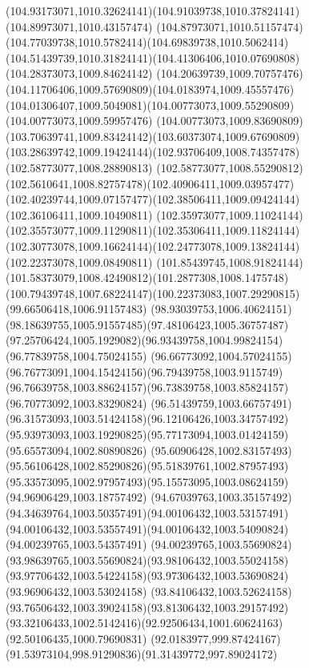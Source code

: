 {{		\curveto(104.93173071,1010.32624141)(104.91039738,1010.37824141)(104.89973071,1010.43157474)
		\curveto(104.87973071,1010.51157474)(104.77039738,1010.5782414)(104.69839738,1010.5062414)
		\curveto(104.51439739,1010.31824141)(104.41306406,1010.07690808)(104.28373073,1009.84624142)
		\curveto(104.20639739,1009.70757476)(104.11706406,1009.57690809)(104.0183974,1009.45557476)
		\curveto(104.01306407,1009.5049081)(104.00773073,1009.55290809)(104.00773073,1009.59957476)
		\curveto(104.00773073,1009.83690809)(103.70639741,1009.83424142)(103.60373074,1009.67690809)
		\curveto(103.28639742,1009.19424144)(102.93706409,1008.74357478)(102.58773077,1008.28890813)
		\curveto(102.58773077,1008.55290812)(102.5610641,1008.82757478)(102.40906411,1009.03957477)
		\curveto(102.40239744,1009.07157477)(102.38506411,1009.09424144)(102.36106411,1009.10490811)
		\curveto(102.35973077,1009.11024144)(102.35573077,1009.11290811)(102.35306411,1009.11824144)
		\curveto(102.30773078,1009.16624144)(102.24773078,1009.13824144)(102.22373078,1009.08490811)
		\curveto(101.85439745,1008.91824144)(101.58373079,1008.42490812)(101.2877308,1008.1475748)
		\curveto(100.79439748,1007.68224147)(100.22373083,1007.29290815)(99.66506418,1006.91157483)
		\curveto(98.93039753,1006.40624151)(98.18639755,1005.91557485)(97.48106423,1005.36757487)
		\curveto(97.25706424,1005.1929082)(96.93439758,1004.99824154)(96.77839758,1004.75024155)
		\curveto(96.66773092,1004.57024155)(96.76773091,1004.15424156)(96.79439758,1003.9115749)
		\curveto(96.76639758,1003.88624157)(96.73839758,1003.85824157)(96.70773092,1003.83290824)
		\curveto(96.51439759,1003.66757491)(96.31573093,1003.51424158)(96.12106426,1003.34757492)
		\curveto(95.93973093,1003.19290825)(95.77173094,1003.01424159)(95.65573094,1002.80890826)
		\curveto(95.60906428,1002.83157493)(95.56106428,1002.85290826)(95.51839761,1002.87957493)
		\curveto(95.33573095,1002.97957493)(95.15573095,1003.08624159)(94.96906429,1003.18757492)
		\curveto(94.67039763,1003.35157492)(94.34639764,1003.50357491)(94.00106432,1003.53157491)
		\curveto(94.00106432,1003.53557491)(94.00106432,1003.54090824)(94.00239765,1003.54357491)
		\curveto(94.00239765,1003.55690824)(93.98639765,1003.55690824)(93.98106432,1003.55024158)
		\curveto(93.97706432,1003.54224158)(93.97306432,1003.53690824)(93.96906432,1003.53024158)
		\curveto(93.84106432,1003.52624158)(93.76506432,1003.39024158)(93.81306432,1003.29157492)
		\curveto(93.32106433,1002.5142416)(92.92506434,1001.60624163)(92.50106435,1000.79690831)
		\curveto(92.0183977,999.87424167)(91.53973104,998.91290836)(91.31439772,997.89024172)
}}
